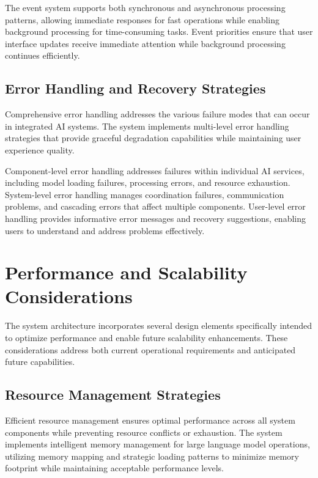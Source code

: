 The event system supports both synchronous and asynchronous processing patterns, allowing immediate responses for fast operations while enabling background processing for time-consuming tasks. Event priorities ensure that user interface updates receive immediate attention while background processing continues efficiently.

\subsection{Error Handling and Recovery Strategies}

Comprehensive error handling addresses the various failure modes that can occur in integrated AI systems. The system implements multi-level error handling strategies that provide graceful degradation capabilities while maintaining user experience quality.

Component-level error handling addresses failures within individual AI services, including model loading failures, processing errors, and resource exhaustion. System-level error handling manages coordination failures, communication problems, and cascading errors that affect multiple components. User-level error handling provides informative error messages and recovery suggestions, enabling users to understand and address problems effectively.

\section{Performance and Scalability Considerations}

The system architecture incorporates several design elements specifically intended to optimize performance and enable future scalability enhancements. These considerations address both current operational requirements and anticipated future capabilities.

\subsection{Resource Management Strategies}

Efficient resource management ensures optimal performance across all system components while preventing resource conflicts or exhaustion. The system implements intelligent memory management for large language model operations, utilizing memory mapping and strategic loading patterns to minimize memory footprint while maintaining acceptable performance levels.

